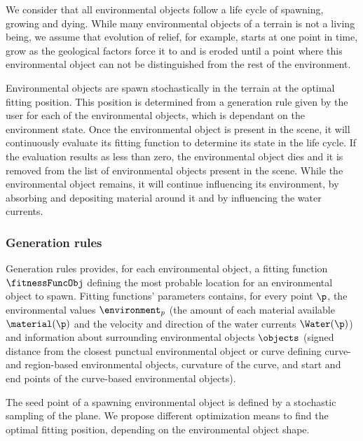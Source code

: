 We consider that all environmental objects follow a life cycle of spawning, growing and dying. While many environmental objects of a terrain is not a living being, we assume that evolution of relief, for example, starts at one point in time, grow as the geological factors force it to and is eroded until a point where this environmental object can not be distinguished from the rest of the environment. 

Environmental objects are spawn stochastically in the terrain at the optimal fitting position. This position is determined from a generation rule given by the user for each of the environmental objects, which is dependant on the environment state.
Once the environmental object is present in the scene, it will continuously evaluate its fitting function to determine its state in the life cycle. If the evaluation results as less than zero, the environmental object dies and it is removed from the list of environmental objects present in the scene. While the environmental object remains, it will continue influencing its environment, by absorbing and depositing material around it and by influencing the water currents. 

\subsubsection{Generation rules}
\label{sec:env-obj-generation-rules}
Generation rules provides, for each environmental object, a fitting function $\fitnessFuncObj$ defining the most probable location for an environmental object to spawn. Fitting functions' parameters contains, for every point $\p$, the environmental values $\environment_p$ (the amount of each material available $\material(\p)$ and the velocity and direction of the water currents $\Water(\p)$) and information about surrounding environmental objects $\objects$ (signed distance from the closest punctual environmental object or curve defining curve- and region-based environmental objects, curvature of the curve, and start and end points of the curve-based environmental objects).

The seed point of a spawning environmental object is defined by a stochastic sampling of the plane. We propose different optimization means to find the optimal fitting position, depending on the environmental object shape.

